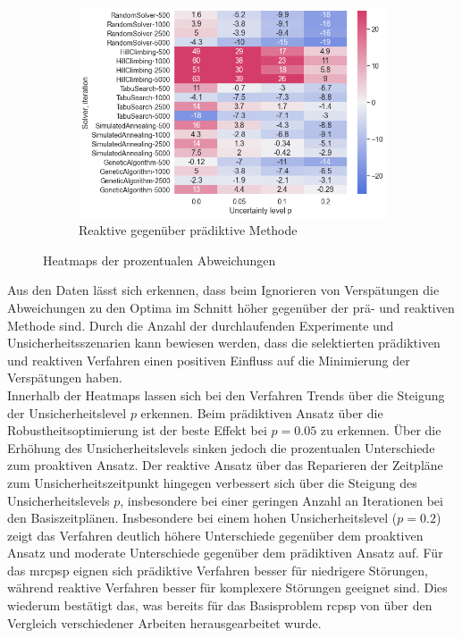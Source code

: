 \begin{figure}[H]
\begin{subfigure}{1\linewidth}
        \centering
        \includegraphics[width=0.5\linewidth]{assets/img/05_Evaluation/Heatmap_n1_3.png}
        \caption{Reaktive gegenüber prädiktive Methode}
        \label{fig:evaluation_solver_n1_heatmap_3}
    \end{subfigure}
    
    \caption{Heatmaps der prozentualen Abweichungen}
    \label{fig:evaluation_n1_heatmaps}
\end{figure}

Aus den Daten lässt sich erkennen, dass beim Ignorieren von Verspätungen die Abweichungen zu den Optima im Schnitt höher gegenüber der prä- und reaktiven Methode sind. Durch die Anzahl der durchlaufenden Experimente und Unsicherheitsszenarien kann bewiesen werden, dass die selektierten prädiktiven und reaktiven Verfahren einen positiven Einfluss auf die Minimierung der Verspätungen haben. \\

Innerhalb der Heatmaps lassen sich bei den Verfahren Trends über die Steigung der Unsicherheitslevel $p$ erkennen. Beim prädiktiven Ansatz über die Robustheitsoptimierung ist der beste Effekt bei $p = 0.05$ zu erkennen. Über die Erhöhung des Unsicherheitslevels sinken jedoch die prozentualen Unterschiede zum proaktiven Ansatz. Der reaktive Ansatz über das Reparieren der Zeitpläne zum Unsicherheitszeitpunkt hingegen verbessert sich über die Steigung des Unsicherheitslevels $p$, insbesondere bei einer geringen Anzahl an Iterationen bei den Basiszeitplänen. Insbesondere bei einem hohen Unsicherheitslevel ($p = 0.2$) zeigt das Verfahren deutlich höhere Unterschiede gegenüber dem proaktiven Ansatz und moderate Unterschiede gegenüber dem prädiktiven Ansatz auf. Für das \ac{mrcpsp} eignen sich prädiktive Verfahren besser für niedrigere Störungen, während reaktive Verfahren besser für komplexere Störungen geeignet sind. Dies wiederum bestätigt das, was bereits für das Basisproblem \ac{rcpsp} von \cite[vgl.][S. 405 f.]{brcic_resource_2012} über den Vergleich verschiedener Arbeiten herausgearbeitet wurde. \\


